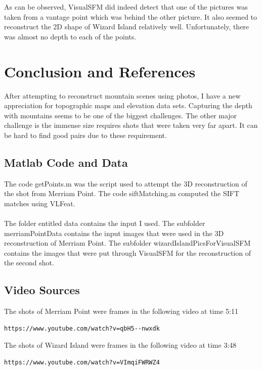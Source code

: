 \documentclass[11pt,psfig]{article}
\begin{document}
As can be observed, VisualSFM did indeed detect that one of the pictures was taken from a vantage point which was behind the other picture. It also seemed to reconstruct the 2D shape of Wizard Island relatively well. Unfortunately, there was almost no depth to each of the points. 


\section{Conclusion and References}

After attempting to reconstruct mountain scenes using photos, I have a new appreciation for topographic maps and elevation data sets. Capturing the depth with mountains seems to be one of the biggest challenges. The other major challenge is the immense size requires shots that were taken very far apart. It can be hard to find good pairs due to these requirement. 

\subsection{Matlab Code and Data}

The code getPoints.m was the script used to attempt the 3D reconstruction of the shot from Merriam Point. The code siftMatching.m computed the SIFT matches using VLFeat. \\
\\
The folder entitled data contains the input I used. The subfolder merriamPointData contains the input images that were used in the 3D reconstruction of Merriam Point. The subfolder wizardIslandPicsForVisualSFM contains the images that were put through VisualSFM for the reconstruction of the second shot. 

\subsection{Video Sources}

The shots of Merriam Point were frames in the following video at time 5:11
\begin{verbatim}
https://www.youtube.com/watch?v=qbH5--nwxdk
\end{verbatim}
The shots of Wizard Island were frames in the following video at time 3:48
\begin{verbatim}
https://www.youtube.com/watch?v=VImqiFWRWZ4
\end{verbatim}
\end{document}
